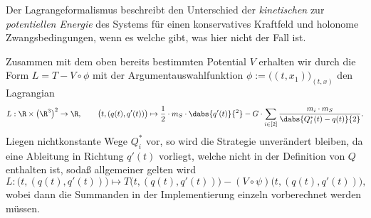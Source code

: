 \documentclass{subfiles}
\begin{document}
    Der Lagrangeformalismus beschreibt den Unterschied der \emph{kinetischen} zur \emph{potentiellen Energie} des Systems für einen konservatives Kraftfeld und holonome Zwangsbedingungen, wenn es welche gibt, was hier nicht der Fall ist.

    Zusammen mit dem oben bereits bestimmten Potential $V$ erhalten wir durch die Form $L = T - V\circ\phi$ mit der Argumentauswahlfunktion $\phi:=\bigl((t,x_1)\bigr)_{(t,x)}$ den Lagrangian
    \[
        L:\R\times\bigl(\R^3\bigr)^2\to\R,\qquad \bigl(t,(q(t),q'(t))\bigr)\mapsto \frac12\cdot m_S\cdot\dabs{q'(t)}{^2} - G\cdot\sum_{i\in[2]}\frac{m_i\cdot m_S}{\dabs{Q_i^*(t) - q(t)}{2}}.
    \]
    Liegen nichtkonstante Wege $Q_i^*$ vor, so wird die Strategie unverändert bleiben, da eine Ableitung in Richtung $q'(t)$ vorliegt, welche nicht in der Definition von $Q$ enthalten ist, sodaß allgemeiner gelten wird
    \[
        L:\bigl(t,(q(t),q'(t))\bigr)\mapsto T\bigl(t,(q(t),q'(t))\bigr) - (V\circ\psi)\bigl(t,(q(t),q'(t))\bigr),
    \]
    wobei dann die Summanden in der Implementierung einzeln vorberechnet werden müssen.
\end{document}
